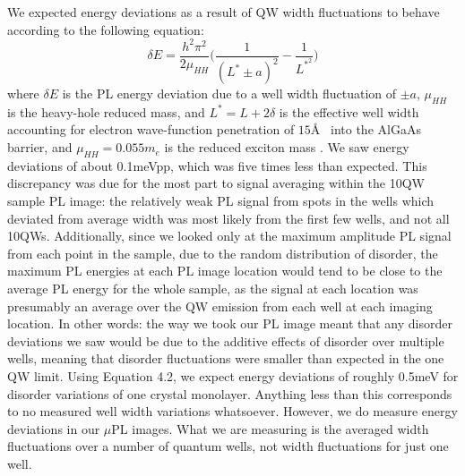 \newpage
\indent We expected energy deviations as a result of QW width fluctuations to behave according to the following equation:
\begin{equation}
\label{de}
\delta E = \frac{h^2 \pi^2}{2 \mu_{HH}}\Big ( \frac{1}{(L^* \pm a)^2}- \frac{1}{L^{*^2}} \Big )
\end{equation}
where $\delta E$ is the PL energy deviation due to a well width fluctuation of $\pm a$, $\mu_{HH}$ is the heavy-hole reduced mass, and $L^* = L+2\delta$ is the effective well width accounting for electron wave-function penetration of $15$\AA ~ into the AlGaAs barrier, and $\mu_{HH} = 0.055m_e$ is the reduced exciton mass \cite{glinka, santos}. We saw energy deviations of about 0.1meVpp, which was five times less than expected. This discrepancy was due for the most part to signal averaging within the 10QW sample PL image: the relatively weak PL signal from spots in the wells which deviated from average width was most likely from the first few wells, and not all 10QWs. Additionally, since we looked only at the maximum amplitude PL signal from each point in the sample, due to the random distribution of disorder, the maximum PL energies at each PL image location would tend to be close to the average PL energy for the whole sample, as the signal at each location was presumably an average over the QW emission from each well at each imaging location. In other words: the way we took our PL image meant that any disorder deviations we saw would be due to the additive effects of disorder over multiple wells, meaning that disorder fluctuations were smaller than expected in the one QW limit. Using Equation 4.2, we expect energy deviations of roughly 0.5meV for disorder variations of one crystal monolayer. Anything less than this corresponds to no measured well width variations whatsoever. However, we do measure energy deviations in our $\mu$PL images. What we are measuring is the averaged width fluctuations over a number of quantum wells, not width fluctuations for just one well.




